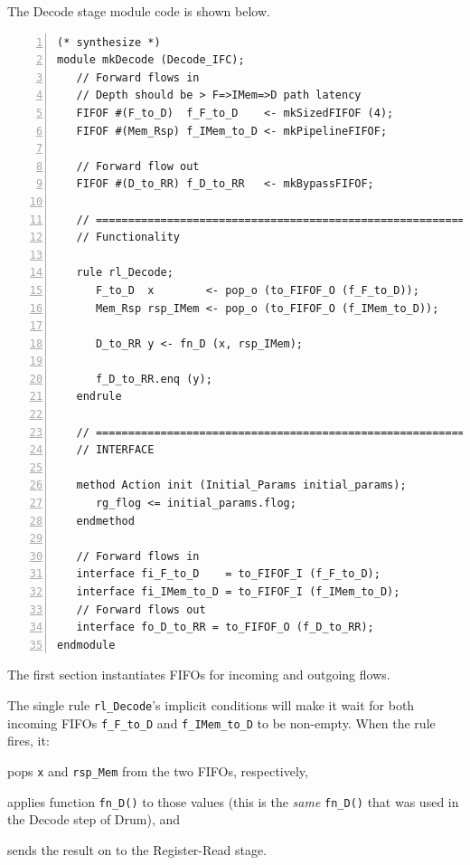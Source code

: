 The Decode stage module code is shown below.

\label{Sec_Fife_Decode_stage}

{\small
\begin{Verbatim}[frame=single, numbers=left, label=(In file:src\_Fife/S2\_Decode.bsv)]
(* synthesize *)
module mkDecode (Decode_IFC);
   // Forward flows in
   // Depth should be > F=>IMem=>D path latency
   FIFOF #(F_to_D)  f_F_to_D    <- mkSizedFIFOF (4);
   FIFOF #(Mem_Rsp) f_IMem_to_D <- mkPipelineFIFOF;

   // Forward flow out
   FIFOF #(D_to_RR) f_D_to_RR   <- mkBypassFIFOF;

   // ================================================================
   // Functionality

   rule rl_Decode;
      F_to_D  x        <- pop_o (to_FIFOF_O (f_F_to_D));
      Mem_Rsp rsp_IMem <- pop_o (to_FIFOF_O (f_IMem_to_D));

      D_to_RR y <- fn_D (x, rsp_IMem);

      f_D_to_RR.enq (y);
   endrule

   // ================================================================
   // INTERFACE

   method Action init (Initial_Params initial_params);
      rg_flog <= initial_params.flog;
   endmethod

   // Forward flows in
   interface fi_F_to_D    = to_FIFOF_I (f_F_to_D);
   interface fi_IMem_to_D = to_FIFOF_I (f_IMem_to_D);
   // Forward flows out
   interface fo_D_to_RR = to_FIFOF_O (f_D_to_RR);
endmodule
\end{Verbatim}
}

The first section instantiates FIFOs for incoming and outgoing flows.

The single rule \verb|rl_Decode|'s implicit conditions will make it
wait for both incoming FIFOs \verb|f_F_to_D| and \verb|f_IMem_to_D| to
be non-empty.  When the rule fires, it:

\begin{tightlist}
 \item pops \verb|x| and \verb|rsp_Mem| from the two FIFOs, respectively,

 \item applies function \verb|fn_D()| to those values (this is the
       \emph{same} \verb|fn_D()| that was used in the Decode step of
       Drum), and

 \item sends the result on to the Register-Read stage.
\end{tightlist}

